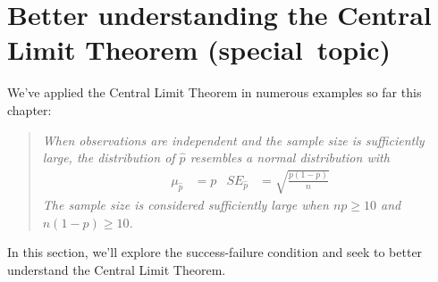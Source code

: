 %
%
%






\section{Better understanding the Central Limit Theorem \mbox{(special~topic)}}

We've applied the Central Limit Theorem in numerous examples
so far this chapter:
\begin{quote}{\em
When observations are independent and the sample size is
sufficiently large, the distribution of $\hat{p}$ resembles
a normal distribution with
\begin{align*}
  \mu_{\hat{p}} &= p
  &SE_{\hat{p}} &= \sqrt{\frac{p (1 - p)}{n}}
\end{align*}
The sample size is considered sufficiently large
when $n p \geq 10$ and $n (1 - p) \geq 10$.
}\end{quote}
In this section, we'll explore the success-failure
condition and seek to better understand the
Central Limit Theorem.

